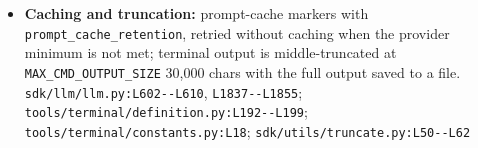 \begin{itemize}
\item \textbf{Caching and truncation:} prompt-cache markers with \texttt{prompt\_\allowbreak{}cache\_\allowbreak{}retention}, retried without caching when the provider minimum is not met; terminal output is middle-truncated at \texttt{MAX\_\allowbreak{}CMD\_\allowbreak{}OUTPUT\_\allowbreak{}SIZE} 30,000 chars with the full output saved to a file. \texttt{sdk/\allowbreak{}llm/\allowbreak{}llm.\allowbreak{}py:\allowbreak{}L602-\allowbreak{}-\allowbreak{}L610}, \texttt{L1837-\allowbreak{}-\allowbreak{}L1855}; \texttt{tools/\allowbreak{}terminal/\allowbreak{}definition.\allowbreak{}py:\allowbreak{}L192-\allowbreak{}-\allowbreak{}L199}; \texttt{tools/\allowbreak{}terminal/\allowbreak{}constants.\allowbreak{}py:\allowbreak{}L18}; \texttt{sdk/\allowbreak{}utils/\allowbreak{}truncate.\allowbreak{}py:\allowbreak{}L50-\allowbreak{}-\allowbreak{}L62}
\end{itemize}

